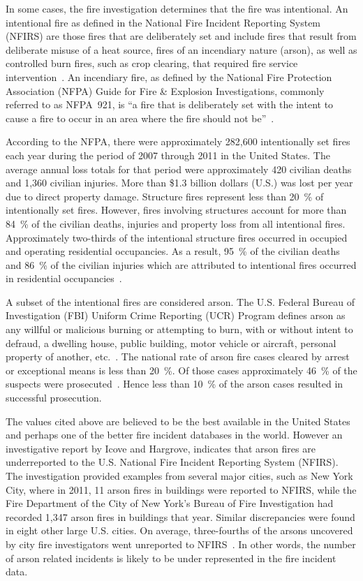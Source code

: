 \documentclass[twoside]{uocthesis}
\begin{document}
In some cases, the fire investigation determines that the fire was intentional.  An intentional fire as defined in the National Fire Incident Reporting System (NFIRS)  are those fires that are deliberately set and include fires that result from deliberate misuse of a heat source, fires of an incendiary nature (arson), as well as controlled burn fires, such as crop clearing, that required fire service intervention~\cite{Campbell:2014}.  An incendiary fire, as defined by the National Fire Protection Association (NFPA) Guide for Fire \& Explosion Investigations, commonly referred to as NFPA~921, is ``a fire that is deliberately set with the intent to cause a fire to occur in an area where the fire should not be''~\cite{NFPA:921}.

According to the NFPA, there were approximately 282,600 intentionally set fires each year during the period of 2007 through 2011 in the United States. The average annual loss totals for that period were approximately 420 civilian deaths and 1,360 civilian injuries. More than \$1.3 billion dollars (U.S.) was lost per year due to direct property damage. Structure fires represent less than 20~\% of intentionally set fires.  However, fires involving structures account for more than 84~\% of the civilian deaths, injuries and property loss from all intentional fires.  Approximately two-thirds of the intentional structure fires occurred in occupied and operating residential occupancies.  As a result, 95~\% of the civilian deaths and 86~\% of the civilian injuries which are attributed to intentional fires occurred in residential occupancies~\cite{Campbell:2014}.

A subset of the intentional fires are considered arson.  The U.S. Federal Bureau of Investigation (FBI) Uniform Crime Reporting (UCR) Program defines arson as any willful or malicious burning or attempting to burn, with or without intent to defraud, a dwelling house, public building, motor vehicle or aircraft, personal property of another, etc.~\cite{Crime:2010}.  The national rate of arson fire cases cleared by arrest or exceptional means is less than 20~\%.  Of those cases approximately 46~\% of the suspects were prosecuted~\cite{Campbell:2014}.  Hence less than 10~\% of the arson cases resulted in successful prosecution.   

The values cited above are believed to be the best available in the United States and perhaps one of the better fire incident databases in the world.  However an investigative report by Icove and Hargrove, indicates that arson fires are underreported to the U.S. National Fire Incident Reporting System (NFIRS).  The investigation provided examples from several major cities, such as New York City, where in 2011, 11 arson fires in buildings were reported to NFIRS, while the Fire Department of the City of New York's Bureau of Fire Investigation had recorded 1,347 arson fires in buildings that year.  Similar discrepancies were found in eight other large U.S. cities.  On average, three-fourths of the arsons uncovered by city fire investigators went unreported to NFIRS~\cite{Icove_2014}.  In other words, the number of arson related incidents is likely to be under represented in the fire incident data.  
\end{document}
